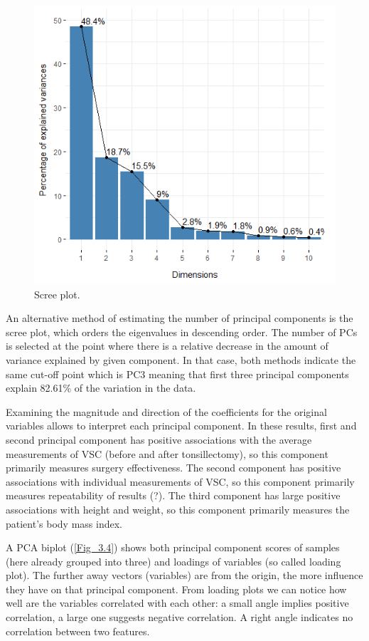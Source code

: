 \documentclass[12pt,a4paper,notitlepage]{report}
\begin{document}
\begin{figure}
	\includegraphics[scale=0.6]{./Figures/Fig_3.3}
	\caption{Scree plot.}
	\label{Fig_3.3}
\end{figure}	

An alternative method of estimating the number of principal components is the scree plot, which orders the eigenvalues in descending order. The number of PCs is selected at the point where there is a relative decrease in the amount of variance explained by given component. In that case, both methods indicate the same cut-off point which is PC3 meaning that first three principal components explain 82.61\% of the variation in the data.

Examining the magnitude and direction of the coefficients for the original variables allows to interpret each principal component. In these results, first and second principal component has positive associations with the average measurements of VSC (before and after tonsillectomy), so this component primarily measures surgery effectiveness. The second component has positive associations with individual measurements of VSC, so this component primarily measures repeatability of results (?). The third component has large positive associations with height and weight, so this component primarily measures the patient's body mass index. 

A PCA biplot (\ref{Fig_3.4}) shows both principal component scores of samples (here already grouped into three) and loadings of variables (so called loading plot). The further away vectors (variables) are from the origin, the more influence they have on that principal component.  From loading plots we can notice how well are the variables correlated with each other: a small angle implies positive correlation, a large one suggests negative correlation. A right angle indicates no correlation between two features.
\end{document}
